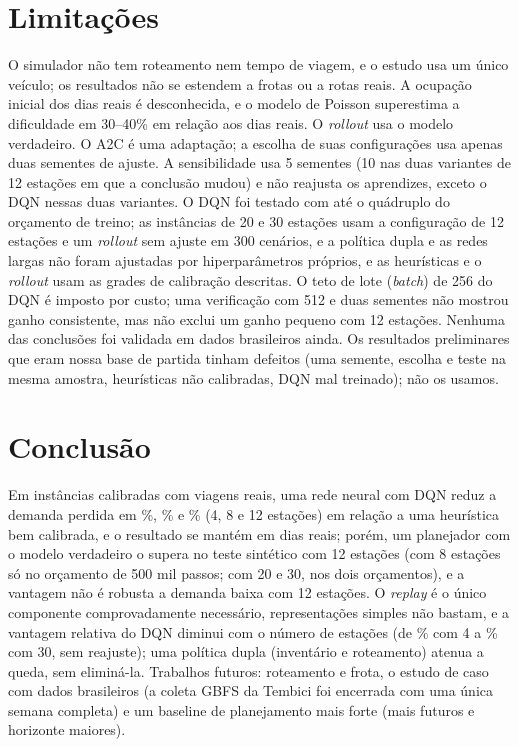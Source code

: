 \documentclass[12pt,a4paper]{article}
\begin{document}
\section{Limita\c{c}\~oes}\label{sec:lim}
O simulador n\~ao tem roteamento nem tempo de viagem, e o estudo usa um \'unico ve\'iculo; os resultados n\~ao se estendem a frotas ou a rotas reais. A
ocupa\c{c}\~ao inicial dos dias reais \'e desconhecida, e o modelo de Poisson superestima a dificuldade em 30--40\% em rela\c{c}\~ao aos dias reais. O
\emph{rollout} usa o modelo verdadeiro. O A2C \'e uma adapta\c{c}\~ao; a escolha de suas configura\c{c}\~oes usa apenas duas sementes de ajuste. A sensibilidade usa 5 sementes (10 nas duas variantes de 12 esta\c{c}\~oes em que a conclus\~ao mudou) e n\~ao reajusta os aprendizes, exceto o DQN nessas duas variantes. O DQN foi testado com at\'e o qu\'adruplo do or\c{c}amento de treino; as inst\^ancias de 20 e 30 esta\c{c}\~oes usam a configura\c{c}\~ao de 12 esta\c{c}\~oes e um \emph{rollout} sem ajuste em 300 cen\'arios, e a pol\'itica dupla e as redes largas n\~ao foram ajustadas por hiperpar\^ametros pr\'oprios, e as heur\'isticas e o \emph{rollout} usam as grades de calibra\c{c}\~ao descritas. O teto de lote (\emph{batch}) de 256 do DQN \'e imposto por custo; uma verifica\c{c}\~ao com 512 e duas sementes n\~ao mostrou ganho consistente, mas n\~ao exclui um ganho pequeno com 12 esta\c{c}\~oes. Nenhuma
das conclus\~oes foi validada em dados brasileiros ainda. Os resultados preliminares que eram nossa base de partida tinham defeitos (uma semente, escolha
e teste na mesma amostra, heur\'isticas n\~ao calibradas, DQN mal treinado); n\~ao os usamos.

\section{Conclus\~ao}
Em inst\^ancias calibradas com viagens reais, uma rede neural com DQN reduz a demanda perdida em \redA\%, \redB\% e \redC\% (4, 8 e 12 esta\c{c}\~oes) em rela\c{c}\~ao a uma heur\'istica
bem calibrada, e o resultado se mant\'em em dias reais; por\'em, um planejador com o modelo verdadeiro o supera no teste sint\'etico com
12 esta\c{c}\~oes (com 8 esta\c{c}\~oes s\'o no or\c{c}amento de 500 mil passos; com 20 e 30, nos dois or\c{c}amentos), e a vantagem n\~ao \'e robusta a demanda baixa com 12 esta\c{c}\~oes. O \emph{replay} \'e o \'unico componente comprovadamente
necess\'ario, representa\c{c}\~oes simples n\~ao bastam, e a vantagem relativa do DQN diminui com o n\'umero de esta\c{c}\~oes (de \scRedFiveA\% com 4 a \scRedFiveE\% com 30, sem reajuste); uma pol\'itica dupla (invent\'ario e roteamento) atenua a queda, sem elimin\'a-la. Trabalhos futuros: roteamento e frota, o estudo de caso com dados brasileiros
(a coleta GBFS da Tembici foi encerrada com uma \'unica semana completa) e um baseline de planejamento mais forte (mais futuros e horizonte maiores).



\end{document}
